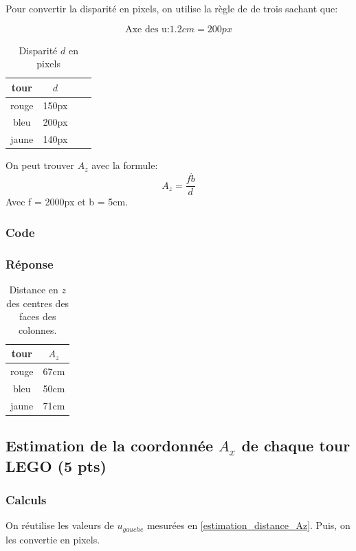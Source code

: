 \documentclass[12pt]{article}
\begin{document}
Pour convertir la disparit\'e en pixels, on utilise la r\`egle de de trois sachant que:

\[ \text{Axe des u:} 1.2cm = 200px \]


\begin{table}[h]
\caption{Disparit\'e $d$ en pixels}
\label{TableCoord}
\begin{center}
\begin{tabular}{|c|c|c|c|}
\hline
    tour   &  $d$ \\
\hline
    rouge  &  150px \\
    bleu   &  200px \\
    jaune  &  140px \\
\hline
\end{tabular}
\end{center}
\end{table}

On peut trouver $A_z$ avec la formule:
\[ A_z = \frac{f \dot b}{d}\]
Avec f = 2000px et b = 5cm.

\subsubsection{Code}
\subsubsection{Réponse}

\begin{table}[h]
\caption{Distance en $z$ des centres des faces des colonnes.}
\label{TableCoord}
\begin{center}
\begin{tabular}{|c|c|}
\hline
 tour   & $A_z$ \\
\hline
 rouge  & 67cm \\
 bleu   & 50cm \\
jaune   & 71cm \\
\hline
\end{tabular}
\end{center}
\end{table}


\subsection{Estimation de la coordonnée $A_x$ de chaque tour LEGO (5 pts)}
\subsubsection{Calculs}
On r\'eutilise les valeurs de $u_{gauche}$ mesur\'ees en \ref{estimation_distance_Az}.
Puis, on les convertie en pixels.
\end{document}
